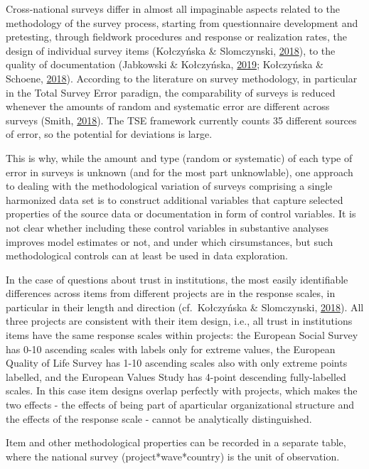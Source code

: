\documentclass[12pt,]{article}
\begin{document}
Cross-national surveys differ in almost all impaginable aspects related to the methodology of the survey process, starting from questionnaire development and pretesting, through fieldwork procedures and response or realization rates, the design of individual survey items (Kołczyńska \& Slomczynski, \protect\hyperlink{ref-KolczynskaSlomczynski2018}{2018}), to the quality of documentation (Jabkowski \& Kołczyńska, \protect\hyperlink{ref-Jabkowski2019}{2019}; Kołczyńska \& Schoene, \protect\hyperlink{ref-KolczynskaSchoene2018}{2018}). According to the literature on survey methodology, in particular in the Total Survey Error paradign, the comparability of surveys is reduced whenever the amounts of random and systematic error are different across surveys (Smith, \protect\hyperlink{ref-Smith2018}{2018}). The TSE framework currently counts 35 different sources of error, so the potential for deviations is large.

This is why, while the amount and type (random or systematic) of each type of error in surveys is unknown (and for the most part unknowlable), one approach to dealing with the methodological variation of surveys comprising a single harmonized data set is to construct additional variables that capture selected properties of the source data or documentation in form of control variables. It is not clear whether including these control variables in substantive analyses improves model estimates or not, and under which cirsumstances, but such methodological controls can at least be used in data exploration.

In the case of questions about trust in institutions, the most easily identifiable differences across items from different projects are in the response scales, in particular in their length and direction (cf.~Kołczyńska \& Slomczynski, \protect\hyperlink{ref-KolczynskaSlomczynski2018}{2018}). All three projects are consistent with their item design, i.e., all trust in institutions items have the same response scales within projects: the European Social Survey has 0-10 ascending scales with labels only for extreme values, the European Quality of Life Survey has 1-10 ascending scales also with only extreme points labelled, and the European Values Study has 4-point descending fully-labelled scales. In this case item designs overlap perfectly with projects, which makes the two effects - the effects of being part of aparticular organizational structure and the effects of the response scale - cannot be analytically distinguished.

Item and other methodological properties can be recorded in a separate table, where the national survey (project*wave*country) is the unit of observation.
\end{document}

